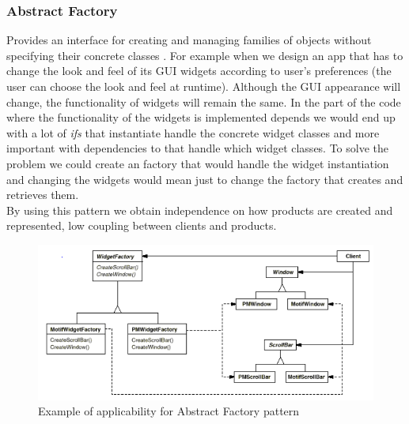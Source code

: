 \documentclass{article}[11]
\begin{document}
	\subsubsection{Abstract Factory}
		Provides an interface for creating and managing families of objects without specifying their concrete classes \cite{gamma1995design}. For example when we design an app that has to change the look and feel of its GUI widgets according to user's preferences (the user can choose the look and feel at runtime). Although the GUI appearance will change, the functionality of widgets will remain the same. In the part of the code where the functionality of the widgets is implemented depends we would end up with a lot of \emph{ifs} that instantiate handle the concrete widget classes and more important with dependencies to that handle which widget classes. To solve the problem we could create an factory that would handle the widget instantiation and changing the widgets would mean just to change the factory that creates and retrieves them.\\
		By using this pattern we obtain independence on how products are created and represented, low coupling between clients and products. 
		\begin{figure}[H]
	
			\includegraphics[scale=0.75]{./imgs/Factory}
			\caption{Example of applicability for Abstract Factory pattern \cite{gamma1995design}}
		\end{figure}
\end{document}
